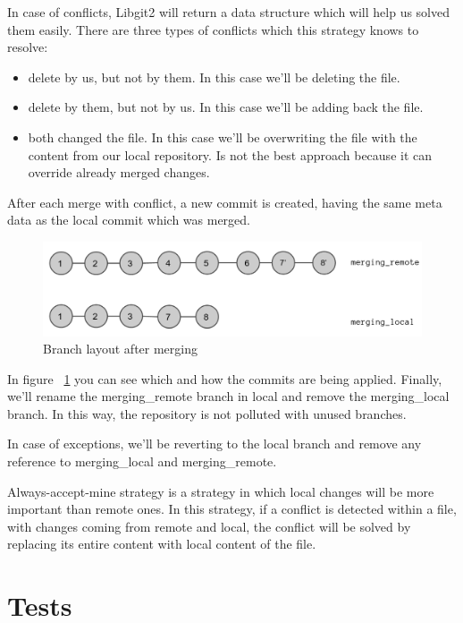 In case of conflicts, Libgit2 will return a data structure which will help us solved them easily. There are three types of conflicts which this strategy knows to resolve:
\begin{itemize}
    \item delete by us, but not by them. In this case we'll be deleting the file.
    \item delete by them, but not by us. In this case we'll be adding back the file.
    \item both changed the file. In this case we'll be overwriting the file with the content from our local repository. Is not the best approach because it can override already merged changes.
\end{itemize}

After each merge with conflict, a new commit is created, having the same meta data as the local commit which was merged.

\begin{figure}[h]
  \begin{center}
    \includegraphics[width=16cm]{layout/merging-end.png}
  \end{center}
  \caption{Branch layout after merging}
  \label{fig:merging}
\end{figure}

In figure ~\ref{fig:merging} you can see which and how the commits are being applied. Finally, we'll rename the merging\_remote branch in local and remove the merging\_local branch. In this way, the repository is not polluted with unused branches.

In case of exceptions, we'll be reverting to the local branch and remove any reference to merging\_local and merging\_remote.

Always-accept-mine strategy is a strategy in which local changes will be more important than remote ones. In this strategy, if a conflict is detected within a file, with changes coming from remote and local, the conflict will be solved by replacing its entire content with local content of the file.

\section{Tests}

